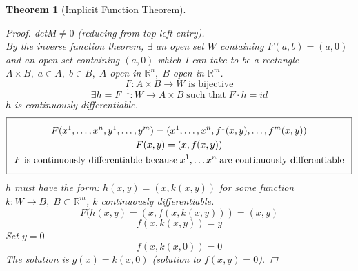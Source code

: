 \documentclass[11pt]{article}
\def\RR{\mathbb{R}}
\newtheorem{theorem}{Theorem}[section]
\begin{document}
\begin{theorem}[Implicit Function Theorem]
\begin{proof}
det$M \neq 0$ (reducing from top left entry).\\
By the inverse function theorem, $\exists$ an open set $W$ containing $F(a,b) = (a,0)$ and an open set containing $(a,0)$ which I can take to be a rectangle $A \times B, \;  a \in A , \; b \in B, \; A$ open in $\RR^n, \; B$ open in $\RR^m$.\\
\[F:A \times B \rightarrow W \text{ is bijective}\]
\[\exists h = F^{-1}:W \rightarrow A \times B \; \text{such that} \; F \cdot h = id\]
$h$ is continuously differentiable.
\begin{equation*} 
  \addtolength{\fboxsep}{5pt} 
   \boxed{ 
   \begin{gathered} 
      F(x^1,\dots , x^n,y^1, \dots,y^m) = (x^1, \dots , x^n, f^1(x,y), \dots , f^m(x,y))  \\ 
      F(x,y) = (x,f(x,y)) 
      \\ F \;\text{is continuously differentiable because} \; x^1 , \dots x^n \; \text{are continuously differentiable}
   \end{gathered} 
   } 
\end{equation*}
$h$ must have the form: $h(x,y) =  (x,k(x,y))$ for some function $k:W \rightarrow B, \; B \subset \RR^m$, $k$ continuously differentiable.
\[F(h(x,y) = (x,f(x,k(x,y))) = (x,y)\]
\[f(x,k(x,y)) = y\]
Set $y=0$
\[f(x,k(x,0))=0\]
The solution is $g(x)=k(x,0)$ (solution to $f(x,y)= 0$).
\end{proof}
\end{theorem}
\end{document}
